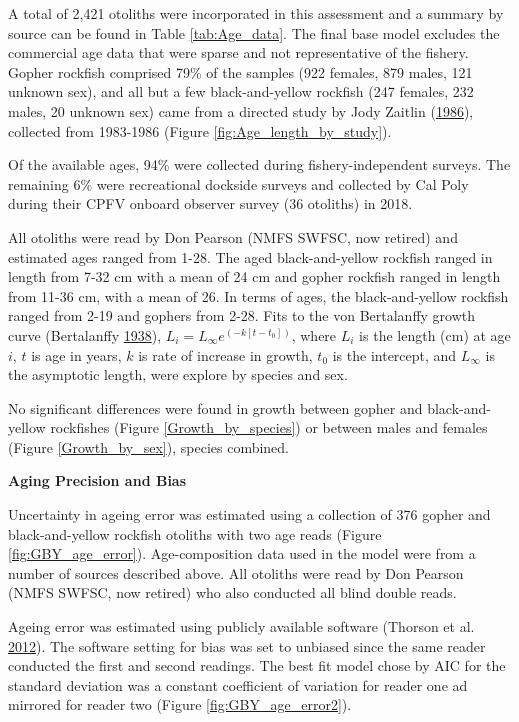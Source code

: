 \documentclass[12pt,]{article}
\begin{document}
A total of 2,421 otoliths were incorporated in this assessment and a
summary by source can be found in Table \ref{tab:Age_data}. The final
base model excludes the commercial age data that were sparse and not
representative of the fishery. Gopher rockfish comprised 79\% of the
samples (922 females, 879 males, 121 unknown sex), and all but a few
black-and-yellow rockfish (247 females, 232 males, 20 unknown sex) came
from a directed study by Jody Zaitlin
(\protect\hyperlink{ref-Zaitlin1986}{1986}), collected from 1983-1986
(Figure \ref{fig:Age_length_by_study}).

Of the available ages, 94\% were collected during fishery-independent
surveys. The remaining 6\% were recreational dockside surveys and
collected by Cal Poly during their CPFV onboard observer survey (36
otoliths) in 2018.

All otoliths were read by Don Pearson (NMFS SWFSC, now retired) and
estimated ages ranged from 1-28. The aged black-and-yellow rockfish
ranged in length from 7-32 cm with a mean of 24 cm and gopher rockfish
ranged in length from 11-36 cm, with a mean of 26. In terms of ages, the
black-and-yellow rockfish ranged from 2-19 and gophers from 2-28. Fits
to the von Bertalanffy growth curve (Bertalanffy
\protect\hyperlink{ref-vonB1938}{1938}),
\(L_i = L_{\infty}e^{(-k[t-t_0])}\), where \(L_i\) is the length (cm) at
age \(i\), \(t\) is age in years, \(k\) is rate of increase in growth,
\(t_0\) is the intercept, and \(L_{\infty}\) is the asymptotic length,
were explore by species and sex.

No significant differences were found in growth between gopher and
black-and-yellow rockfishes (Figure \ref{Growth_by_species}) or between
males and females (Figure \ref{Growth_by_sex}), species combined.

\vspace{.5cm} \textbf{Aging Precision and Bias}

Uncertainty in ageing error was estimated using a collection of 376
gopher and black-and-yellow rockfish otoliths with two age reads (Figure
\ref{fig:GBY_age_error}). Age-composition data used in the model were
from a number of sources described above. All otoliths were read by Don
Pearson (NMFS SWFSC, now retired) who also conducted all blind double
reads.

Ageing error was estimated using publicly available software (Thorson et
al. \protect\hyperlink{ref-Thorson2012}{2012}). The software setting for
bias was set to unbiased since the same reader conducted the first and
second readings. The best fit model chose by AIC for the standard
deviation was a constant coefficient of variation for reader one ad
mirrored for reader two (Figure \ref{fig:GBY_age_error2}).
\end{document}
